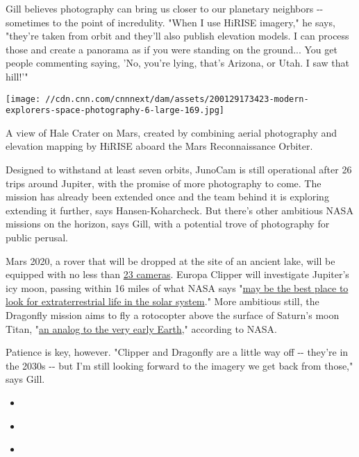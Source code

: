 Gill believes photography can bring us closer to our planetary neighbors
-\/- sometimes to the point of incredulity. "When I use HiRISE imagery,"
he says, "they're taken from orbit and they'll also publish elevation
models. I can process those and create a panorama as if you were
standing on the ground... You get people commenting saying, 'No, you're
lying, that's Arizona, or Utah. I saw that hill!'"

\texttt{[image: //cdn.cnn.com/cnnnext/dam/assets/200129173423-modern-explorers-space-photography-6-large-169.jpg]}

A view of Hale Crater on Mars, created by combining aerial photography
and elevation mapping by HiRISE aboard the Mars Reconnaissance Orbiter.

Designed to withstand at least seven orbits, JunoCam is still
operational after 26 trips around Jupiter, with the promise of more
photography to come. The mission has already been extended once and the
team behind it is exploring extending it further, says
Hansen-Koharcheck. But there's other ambitious NASA missions on the
horizon, says Gill, with a potential trove of photography for public
perusal.

Mars 2020, a rover that will be dropped at the site of an ancient lake,
will be equipped with no less than
\href{https://mars.nasa.gov/mars2020/mission/rover/cameras/}{23
cameras}. Europa Clipper will investigate Jupiter's icy moon, passing
within 16 miles of what NASA says
"\href{https://europa.nasa.gov/mission/science-overview/}{may be the
best place to look for extraterrestrial life in the solar system}." More
ambitious still, the Dragonfly mission aims to fly a rotocopter above
the surface of Saturn's moon Titan,
"\href{https://www.nasa.gov/press-release/nasas-dragonfly-will-fly-around-titan-looking-for-origins-signs-of-life}{an
analog to the very early Earth}," according to NASA.

Patience is key, however. "Clipper and Dragonfly are a little way off
-\/- they're in the 2030s -\/- but I'm still looking forward to the
imagery we get back from those," says Gill.

\begin{itemize}
\item
\end{itemize}

\begin{itemize}
\item
\end{itemize}

\begin{itemize}
\item
\end{itemize}

